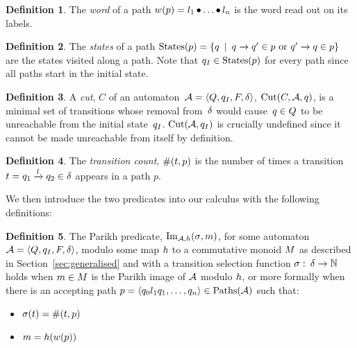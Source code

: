 \documentclass[acmsmall,review,anonymous]{acmart}\settopmatter{printfolios=true,printccs=false,printacmref=true}
\theoremstyle{definition}
\newtheorem{definition}{Definition}[section]
\begin{document}
\begin{definition}
  The \textit{word} of a path $w(p) = l_1 \operatorname{\bullet} \ldots \operatorname{\bullet} l_n$ is
  the word read out on its labels.
\end{definition}

\begin{definition}
  The \textit{states} of a path $\operatorname{States}(p) = \left\{q \:\mid\:
  q \xrightarrow{} q' \in p \text{ or }
  q' \xrightarrow{} q \in p\right\}$ are the states visited along a
  path. Note that $q_I \in \operatorname{States}(p)$ for every path since all
  paths start in the initial state.
\end{definition}

\begin{definition}
  A \textit{cut}, $C$ of an automaton~$\mathcal{A} = \left\langle Q, q_I, F, \delta\right\rangle$,
  $\operatorname{Cut}(C, \mathcal{A}, q)$, is a minimal set of transitions whose
  removal from~$\delta$ would cause~$q \in Q$ to be unreachable
  from the initial state~$q_I$. $\operatorname{Cut}(\mathcal{A},
  q_I)$ is crucially undefined since it cannot be made unreachable
  from itself by definition.
\end{definition}

\begin{definition}
 The \textit{transition count}, $\operatorname{\#}(t, p)$ is the
 number of times a transition $t =
 q_1 \xrightarrow{l} q_2 \in \delta$ appears in a path
 $p$.
\end{definition}

We then introduce the two predicates into our calculus with the following
definitions:

\begin{definition}
  The Parikh predicate, $\operatorname{Im}_{\mathcal{A}, h}(\operatorname{\sigma}, m)$, for some automaton
  $\mathcal{A} = \left\langle Q, q_I, F, \delta\right\rangle$, modulo some map $h$ to a commutative monoid
  $M$ as described in Section~\ref{sec:generalised} and with a transition
  selection function $\operatorname{\sigma}:\: \delta \to \mathbb{N}$ holds when
  $m \in M$ is the Parikh image of $\mathcal{A}$ modulo
  $h$, or more formally when there is an accepting path $p =
  \left\langle q_0 l_1 q_1 , \ldots , q_n\right\rangle \in \operatorname{Paths}(\mathcal{A})$ such that:
  \begin{itemize}
    \item $\operatorname{\sigma}(t) = \operatorname{\#}(t, p)$
    \item $m = h(w(p))$
  \end{itemize}
\end{definition}
\end{document}
